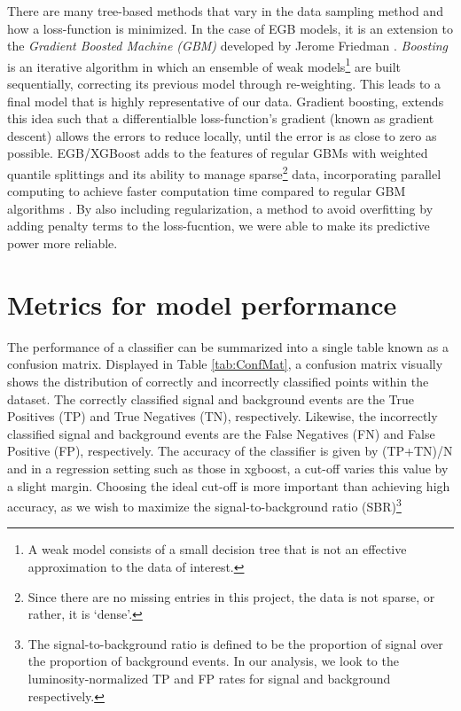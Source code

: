 There are many tree-based methods that vary in the data sampling method and how a loss-function is minimized. In the case of EGB models, it is an extension to the \textit{Gradient Boosted Machine (GBM)} developed by Jerome Friedman \cite{friedman2001greedy}. \textit{Boosting} is an iterative algorithm in which an ensemble of weak models\footnote{A weak model consists of a small decision tree that is not an effective approximation to the data of interest.} are built sequentially, correcting its previous model through re-weighting. This leads to a final model that is highly representative of our data. Gradient boosting, extends this idea such that a differentialble loss-function's gradient (known as gradient descent) allows the errors to reduce locally, until the error is as close to zero as possible. EGB/XGBoost adds to the features of regular GBMs with weighted quantile splittings and its ability to manage sparse\footnote{Since there are no missing entries in this project, the data is not sparse, or rather, it is `dense'.} data, incorporating parallel computing to achieve faster computation time compared to regular GBM algorithms \cite{chen2016xgboost}. By also including regularization, a method to avoid overfitting by adding penalty terms to the loss-fucntion, we were able to make its predictive power more reliable. \\
\section{Metrics for model performance}
\label{sec:metrics}
The performance of a classifier can be summarized into a single table known as a confusion matrix. Displayed in Table \ref{tab:ConfMat}, a confusion matrix visually shows the distribution of correctly and incorrectly classified points within the dataset. The correctly classified signal and background events are the True Positives (TP) and True Negatives (TN), respectively. Likewise, the incorrectly classified signal and background events are the False Negatives (FN) and False Positive (FP), respectively. The accuracy of the classifier is given by (TP+TN)/N and in a regression setting such as those in xgboost, a cut-off varies this value by a slight margin. Choosing the ideal cut-off is more important than achieving high accuracy, as we wish to maximize the signal-to-background ratio (SBR)\footnote{The signal-to-background ratio is defined to be the proportion of signal over the proportion of background events. In our analysis, we look to the luminosity-normalized TP and FP rates for signal and background respectively.}\\

